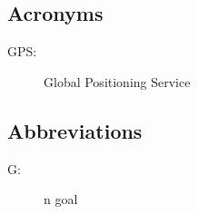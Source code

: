 \documentclass[../../DD.tex]{subfiles}
\begin{document}
		\subsection{Acronyms}
		\begin{description}
		\item[GPS:]Global Positioning Service
		\end{description}
		\subsection{Abbreviations}
		\begin{description}
			 \item[G:]n goal
			
		\end{description}
		
\end{document}
